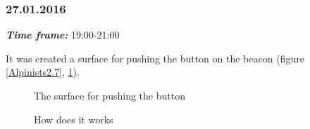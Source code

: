 \subsubsection{27.01.2016}
\textit{\textbf{Time frame:}} 19:00-21:00

It was created a surface for pushing the button on the beacon (figure \ref{Alpinists2.7}, \ref{Alpinists2.8}).

\begin{figure}[H]
	\begin{minipage}[h]{0.58\linewidth}
		\caption{The surface for pushing the button}
		\label{Alpinists2.7}
	\end{minipage}
	\hfill
	\begin{minipage}[h]{0.37\linewidth}
		\caption{How does it works}
		\label{Alpinists2.8}
	\end{minipage}
\end{figure}
